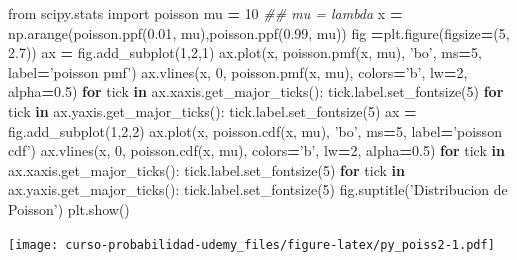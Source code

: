 \documentclass[]{book}
\newenvironment{Shaded}{\begin{snugshade}}{\end{snugshade}}
\newcommand{\CommentTok}[1]{\textcolor[rgb]{0.56,0.35,0.01}{\textit{#1}}}
\newcommand{\ControlFlowTok}[1]{\textcolor[rgb]{0.13,0.29,0.53}{\textbf{#1}}}
\newcommand{\DecValTok}[1]{\textcolor[rgb]{0.00,0.00,0.81}{#1}}
\newcommand{\FloatTok}[1]{\textcolor[rgb]{0.00,0.00,0.81}{#1}}
\newcommand{\ImportTok}[1]{#1}
\newcommand{\KeywordTok}[1]{\textcolor[rgb]{0.13,0.29,0.53}{\textbf{#1}}}
\newcommand{\NormalTok}[1]{#1}
\newcommand{\OperatorTok}[1]{\textcolor[rgb]{0.81,0.36,0.00}{\textbf{#1}}}
\newcommand{\StringTok}[1]{\textcolor[rgb]{0.31,0.60,0.02}{#1}}
\begin{document}
\begin{Shaded}
\begin{Highlighting}[]
\ImportTok{from}\NormalTok{ scipy.stats }\ImportTok{import}\NormalTok{ poisson}
\NormalTok{mu }\OperatorTok{=} \DecValTok{10} \CommentTok{## mu = lambda}
\NormalTok{x }\OperatorTok{=}\NormalTok{ np.arange(poisson.ppf(}\FloatTok{0.01}\NormalTok{, mu),poisson.ppf(}\FloatTok{0.99}\NormalTok{, mu))}
\NormalTok{fig }\OperatorTok{=}\NormalTok{plt.figure(figsize}\OperatorTok{=}\NormalTok{(}\DecValTok{5}\NormalTok{, }\FloatTok{2.7}\NormalTok{))}
\NormalTok{ax }\OperatorTok{=}\NormalTok{ fig.add_subplot(}\DecValTok{1}\NormalTok{,}\DecValTok{2}\NormalTok{,}\DecValTok{1}\NormalTok{)}
\NormalTok{ax.plot(x, poisson.pmf(x, mu), }\StringTok{'bo'}\NormalTok{, ms}\OperatorTok{=}\DecValTok{5}\NormalTok{, label}\OperatorTok{=}\StringTok{'poisson pmf'}\NormalTok{)}
\NormalTok{ax.vlines(x, }\DecValTok{0}\NormalTok{, poisson.pmf(x, mu), colors}\OperatorTok{=}\StringTok{'b'}\NormalTok{, lw}\OperatorTok{=}\DecValTok{2}\NormalTok{, alpha}\OperatorTok{=}\FloatTok{0.5}\NormalTok{)}
\ControlFlowTok{for}\NormalTok{ tick }\KeywordTok{in}\NormalTok{ ax.xaxis.get_major_ticks():}
\NormalTok{  tick.label.set_fontsize(}\DecValTok{5}\NormalTok{)}
\ControlFlowTok{for}\NormalTok{ tick }\KeywordTok{in}\NormalTok{ ax.yaxis.get_major_ticks():}
\NormalTok{  tick.label.set_fontsize(}\DecValTok{5}\NormalTok{) }
\NormalTok{ax }\OperatorTok{=}\NormalTok{ fig.add_subplot(}\DecValTok{1}\NormalTok{,}\DecValTok{2}\NormalTok{,}\DecValTok{2}\NormalTok{)}
\NormalTok{ax.plot(x, poisson.cdf(x, mu), }\StringTok{'bo'}\NormalTok{, ms}\OperatorTok{=}\DecValTok{5}\NormalTok{, label}\OperatorTok{=}\StringTok{'poisson cdf'}\NormalTok{)}
\NormalTok{ax.vlines(x, }\DecValTok{0}\NormalTok{, poisson.cdf(x, mu), colors}\OperatorTok{=}\StringTok{'b'}\NormalTok{, lw}\OperatorTok{=}\DecValTok{2}\NormalTok{, alpha}\OperatorTok{=}\FloatTok{0.5}\NormalTok{)}
\ControlFlowTok{for}\NormalTok{ tick }\KeywordTok{in}\NormalTok{ ax.xaxis.get_major_ticks():}
\NormalTok{  tick.label.set_fontsize(}\DecValTok{5}\NormalTok{)}
\ControlFlowTok{for}\NormalTok{ tick }\KeywordTok{in}\NormalTok{ ax.yaxis.get_major_ticks():}
\NormalTok{  tick.label.set_fontsize(}\DecValTok{5}\NormalTok{)}
\NormalTok{fig.suptitle(}\StringTok{'Distribucion de Poisson'}\NormalTok{)}
\NormalTok{plt.show()}
\end{Highlighting}
\end{Shaded}

\texttt{[image: curso-probabilidad-udemy\_files/figure-latex/py\_poiss2-1.pdf]}
\end{document}

